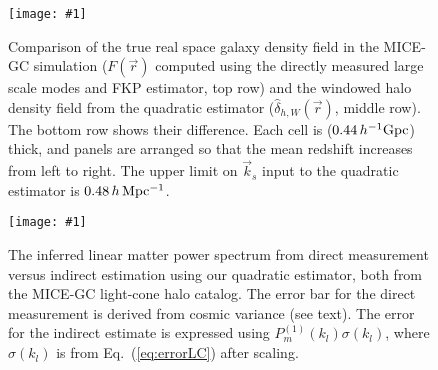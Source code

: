 \documentclass[prd,amsmath,amssymb,floatfix,superscriptaddress,nofootinbib,twocolumn]{revtex4-1}
\newcommand{\ec}[1]{Eq.~(\ref{eq:#1})}
\newcommand{\sfig}[2]{
\texttt{[image: \#1]}
        }
\newcommand{\Sfig}[2]{
   \begin{figure}[thbp]
   \begin{center}
    \sfig{#1.pdf}{\columnwidth}
    \caption{{\small #2}}
    \label{fig:#1}
     \end{center}
   \end{figure}
}
\begin{document}
 \Sfig{real_fkp}{Comparison of the true real space  galaxy density field in the MICE-GC simulation ($F(\vec{r})$ computed using the directly measured large scale modes and FKP estimator, top row) and the windowed halo density field from the quadratic estimator ($\hat{\delta}_{h,W}(\vec{r})$, middle row). The bottom row shows their difference. Each cell is ($0.44\,h^{-1}\rm Gpc$) thick,
   and panels are arranged so that the mean redshift increases from
   left to right.
   The upper limit on $\vec{k}_s$ input to the quadratic estimator is $0.48\,h\,\rm Mpc^{-1}$.}

\Sfig{SN}{The inferred linear matter power spectrum from direct measurement versus indirect estimation using our quadratic estimator, both from the MICE-GC light-cone halo catalog. The error bar for the direct measurement is derived from  cosmic variance (see text). The error for the indirect estimate is expressed using  $P_{m}^{(1)}(k_l)\sigma(k_l)$, where $\sigma(k_l)$ is from \ec{errorLC} after scaling.}
\end{document}
